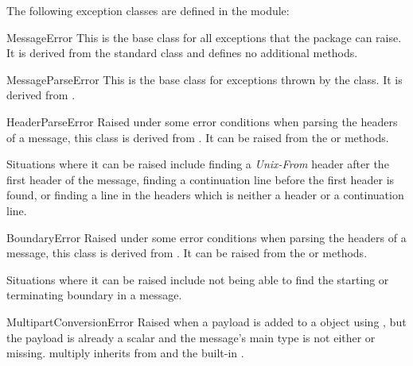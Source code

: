 
The following exception classes are defined in the
 module:

\begin{excclassdesc}{MessageError}{}
This is the base class for all exceptions that the 
package can raise.  It is derived from the standard
 class and defines no additional methods.
\end{excclassdesc}

\begin{excclassdesc}{MessageParseError}{}
This is the base class for exceptions thrown by the 
class.  It is derived from .
\end{excclassdesc}

\begin{excclassdesc}{HeaderParseError}{}
Raised under some error conditions when parsing the  headers of
a message, this class is derived from .
It can be raised from the  or
 methods.

Situations where it can be raised include finding a \emph{Unix-From}
header after the first  header of the message, finding a
continuation line before the first  header is found, or finding
a line in the headers which is neither a header or a continuation
line.
\end{excclassdesc}

\begin{excclassdesc}{BoundaryError}{}
Raised under some error conditions when parsing the  headers of
a message, this class is derived from .
It can be raised from the  or
 methods.

Situations where it can be raised include not being able to find the
starting or terminating boundary in a  message.
\end{excclassdesc}

\begin{excclassdesc}{MultipartConversionError}{}
Raised when a payload is added to a  object using
, but the payload is already a scalar and the
message's  main type is not either
 or missing.  
multiply inherits from  and the built-in
.
\end{excclassdesc}
